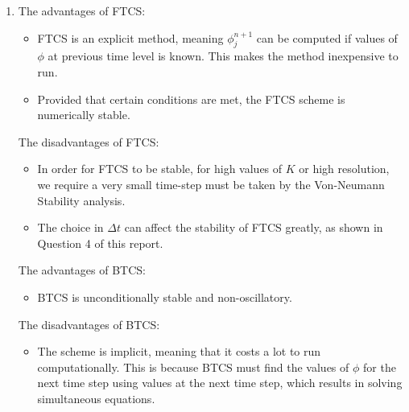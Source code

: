 \documentclass[12pt]{article}
\begin{document}
\begin{enumerate}
\item The advantages of FTCS:
\begin{itemize}
\item FTCS is an explicit method, meaning $\phi_j^{n+1}$ can be computed if values of $\phi$ at previous time level is known. This makes the method inexpensive to run.
\item Provided that certain conditions are met, the FTCS scheme is numerically stable.
\end{itemize}
The disadvantages of FTCS:
\begin{itemize}
\item In order for FTCS to be stable, for high values of $K$ or high resolution, we require a very small time-step must be taken by the Von-Neumann Stability analysis. 
\item The choice in $\Delta t$ can affect the stability of FTCS greatly, as shown in Question 4 of this report.
\end{itemize}
The advantages of BTCS:
\begin{itemize}
\item BTCS is unconditionally stable and non-oscillatory.
\end{itemize}
The disadvantages of BTCS:
\begin{itemize}
\item The scheme is implicit, meaning that it costs a lot to run computationally. This is because BTCS must find the values of $\phi$ for the next time step using values at the next time step, which results in solving simultaneous equations.
\end{itemize}



\end{enumerate}
\end{document}
